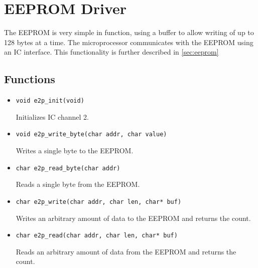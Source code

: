 \section{EEPROM Driver}
\label{sec:eeprom-driver}
The EEPROM is very simple in function, using a buffer to allow writing of up to 128 bytes at a time. The microprocessor communicates with the EEPROM using an IC interface. This functionality is further described in \autoref{sec:eeprom}

\subsection*{Functions}
\begin{itemize}
\item \verb|void e2p_init(void)|

Initializes IC channel 2.

\item \verb|void e2p_write_byte(char addr, char value)|

Writes a single byte to the EEPROM.

\item \verb|char e2p_read_byte(char addr)|

Reads a single byte from the EEPROM.

\item \verb|char e2p_write(char addr, char len, char* buf)|

Writes an arbitrary amount of data to the EEPROM and returns the count.

\item \verb|char e2p_read(char addr, char len, char* buf)|

Reads an arbitrary amount of data from the EEPROM and returns the count.
\end{itemize}

